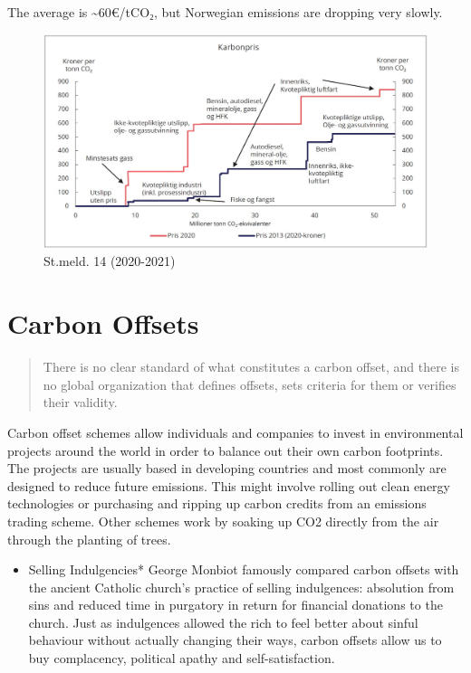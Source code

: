 \documentclass[
]{book}
\providecommand{\tightlist}{%
  \setlength{\itemsep}{0pt}\setlength{\parskip}{0pt}}
\begin{document}
The average is \textasciitilde60€/tCO₂, but Norwegian emissions are dropping very slowly.

\begin{figure}
\centering
\includegraphics{fig/Norsk_Karbonpris_SM14_2021.jpeg}
\caption{St.meld. 14 (2020-2021)}
\end{figure}

\hypertarget{carbon-offsets}{%
\chapter{Carbon Offsets}\label{carbon-offsets}}

\begin{quote}
There is no clear standard of what constitutes a carbon offset, and there is no global organization that defines offsets, sets criteria for them or verifies their validity.
\end{quote}

Carbon offset schemes allow individuals and companies to invest in environmental projects around the world in order to balance out their own carbon footprints. The projects are usually based in developing countries and most commonly are designed to reduce future emissions. This might involve rolling out clean energy technologies or purchasing and ripping up carbon credits from an emissions trading scheme. Other schemes work by soaking up CO2 directly from the air through the planting of trees.

\begin{itemize}
\tightlist
\item
  Selling Indulgencies*
  George Monbiot famously compared carbon offsets with the ancient Catholic church's practice of selling indulgences: absolution from sins and reduced time in purgatory in return for financial donations to the church.
  Just as indulgences allowed the rich to feel better about sinful behaviour without actually changing their ways, carbon offsets allow us to buy complacency, political apathy and self-satisfaction.
\end{itemize}
\end{document}

